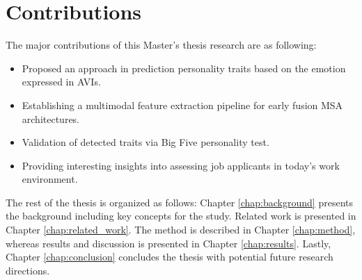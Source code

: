 \section{Contributions}
The major contributions of this Master's thesis research are as following:
\begin{itemize}
    \item Proposed an approach in prediction personality traits based on the emotion expressed in AVIs. \\
    \item Establishing a multimodal feature extraction pipeline for early fusion MSA architectures. \\
    \item Validation of detected traits via Big Five personality test. \\
    \item Providing interesting insights into assessing job applicants in today's work environment. 
\end{itemize}
%
The rest of the thesis is organized as follows: Chapter \ref{chap:background} presents the background including key concepts for the study. Related work is presented in Chapter \ref{chap:related_work}. The method is described in Chapter \ref{chap:method}, whereas results and discussion is presented in Chapter \ref{chap:results}. Lastly, Chapter \ref{chap:conclusion} concludes the thesis with potential future research directions. 
